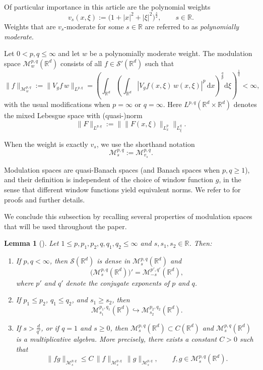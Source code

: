 \documentclass[12pt,reqno,a4paper]{amsart}
\numberwithin{equation}{section}
\theoremstyle{plain}
\newtheorem{lemma}[theorem]{Lemma}
\theoremstyle{definition}
\theoremstyle{remark}
\begin{document}
Of particular importance in this article are the polynomial weights
\[
v_s(x,\xi)
:= \bigl(1+|x|^2+|\xi|^2\bigr)^{\frac{s}{2}},
\qquad s\in\mathbb{R}.
\]
Weights that are $v_s$-moderate for some $s\in\mathbb{R}$ are referred to as
\emph{polynomially moderate}.

Let $0<p,q\le\infty$ and let $w$ be a polynomially moderate weight.
The modulation space $\mathcal{M}^{p,q}_w(\mathbb{R}^d)$ consists of all
$f\in\mathcal{S}'(\mathbb{R}^d)$ such that
\[
\|f\|_{\mathcal{M}^{p,q}_w}
:= \|V_g f\, w\|_{L^{p,q}}
= \left(
\int_{\mathbb{R}^d}
\left(
\int_{\mathbb{R}^d}
|V_g f(x,\xi)\,w(x,\xi)|^p\,\mathrm{d}x
\right)^{\frac{q}{p}}
\mathrm{d}\xi
\right)^{\frac{1}{q}}
<\infty,
\]
with the usual modifications when $p=\infty$ or $q=\infty$.
Here $L^{p,q}(\mathbb{R}^d\times\mathbb{R}^d)$ denotes the mixed Lebesgue space
with (quasi-)norm
\[
\|F\|_{L^{p,q}} := \bigl\|\|F(x,\xi)\|_{L_x^p}\bigr\|_{L_\xi^q}.
\]

When the weight is exactly $v_s$, we use the shorthand notation
\[
\mathcal{M}^{p,q}_s := \mathcal{M}^{p,q}_{v_s}.
\]

Modulation spaces are quasi-Banach spaces (and Banach spaces when $p,q\ge1$),
and their definition is independent of the choice of window function $g$,
in the sense that different window functions yield equivalent norms.
We refer to
\cite{MR4286055,MR4201879,MR2028532,MR1843717}
for proofs and further details.

We conclude this subsection by recalling several properties of modulation spaces
that will be used throughout the paper.

\begin{lemma}[\cite{MR4849356}]
\label{Inclusionrelation}
Let $1\le p,p_1,p_2,q,q_1,q_2\le\infty$ and $s,s_1,s_2\in\mathbb{R}$. Then:
\begin{enumerate}
\item If $p,q<\infty$, then $\mathcal{S}(\mathbb{R}^d)$ is dense in
$\mathcal{M}^{p,q}_s(\mathbb{R}^d)$ and
\[
\bigl(\mathcal{M}^{p,q}_s(\mathbb{R}^d)\bigr)'
= \mathcal{M}^{p',q'}_{-s}(\mathbb{R}^d),
\]
where $p'$ and $q'$ denote the conjugate exponents of $p$ and $q$.

\item If $p_1\le p_2$, $q_1\le q_2$, and $s_1\ge s_2$, then
\[
\mathcal{M}^{p_1,q_1}_{s_1}(\mathbb{R}^d)
\hookrightarrow
\mathcal{M}^{p_2,q_2}_{s_2}(\mathbb{R}^d).
\]

\item If $s>\frac{d}{q'}$, or if $q=1$ and $s\ge0$, then
$\mathcal{M}^{p,q}_s(\mathbb{R}^d)\subset C(\mathbb{R}^d)$ and
$\mathcal{M}^{p,q}_s(\mathbb{R}^d)$ is a multiplicative algebra.
More precisely, there exists a constant $C>0$ such that
\[
\|fg\|_{\mathcal{M}^{p,q}_s}
\le C\,
\|f\|_{\mathcal{M}^{p,q}_s}\,
\|g\|_{\mathcal{M}^{p,q}_s},
\qquad
f,g\in\mathcal{M}^{p,q}_s(\mathbb{R}^d).
\]
\end{enumerate}
\end{lemma}
\end{document}
